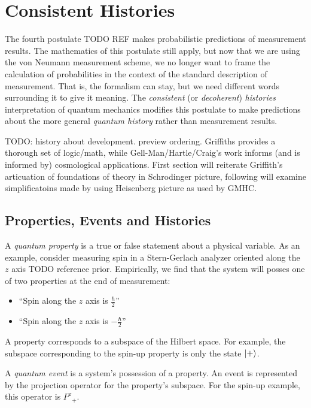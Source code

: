 \usetikzlibrary{shapes.geometric}
\usetikzlibrary{positioning}

\chapter{Consistent Histories}

The fourth postulate TODO REF makes probabilistic predictions of measurement results. The mathematics of this postulate still apply, but now that we are using the von Neumann measurement scheme, we no longer want to frame the calculation of probabilities in the context of the standard description of measurement. That is, the formalism can stay, but we need different words surrounding it to give it meaning. The \textit{consistent} (or \textit{decoherent}) \textit{histories} interpretation of quantum mechanics modifies this postulate to make predictions about the more general \textit{quantum history} rather than measurement results.

TODO: history about development. preview ordering. Griffiths provides a thorough set of logic/math, while Gell-Man/Hartle/Craig's work informs (and is informed by) cosmological applications. First section will reiterate Griffith's articuation of foundations of theory in Schrodinger picture, following will examine simplificatoins made by using Heisenberg picture as used by GMHC.

\section{Properties, Events and Histories}

A \textit{quantum property} is a true or false statement about a physical variable. As an example, consider measuring spin in a Stern-Gerlach analyzer oriented along the $z$ axis TODO reference prior. Empirically, we find that the system will posses one of two properties at the end of measurement:
\begin{itemize}
  \item ``Spin along the $z$ axis is $\frac{\hbar}{2}$''
  \item ``Spin along the $z$ axis is $-\frac{\hbar}{2}$''
\end{itemize}

A property corresponds to a subspace of the Hilbert space. For example, the subspace corresponding to the spin-up property is only the state $\ket{+}$.

A \textit{quantum event} is a system's possession of a property. An event is represented by the projection operator for the property's subspace. For the spin-up example, this operator is ${P^z}_+$.

